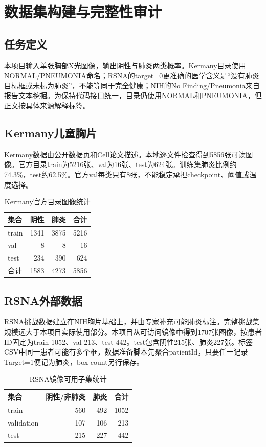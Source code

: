 \chapter{数据集构建与完整性审计}

\section{任务定义}

本项目输入单张胸部X光图像，输出阴性与肺炎两类概率。Kermany目录使用NORMAL/PNEUMONIA命名；RSNA的target=0更准确的医学含义是“没有肺炎目标框或未标为肺炎”，不能等同于完全健康；NIH的No Finding/Pneumonia来自报告文本挖掘。为保持代码接口统一，目录仍使用NORMAL和PNEUMONIA，但正文按具体来源解释标签。

\section{Kermany儿童胸片}

Kermany数据由公开数据页和Cell论文描述\cite{kermanydata2018,kermany2018}。本地逐文件检查得到5856张可读图像。官方目录train为5216张、val为16张、test为624张。训练集肺炎比例约74.3\%，test约62.5\%。官方val每类只有8张，不能稳定承担checkpoint、阈值或温度选择。

\begin{table}[H]
\centering
\caption{Kermany官方目录图像统计}
\begin{tabular}{lrrr}
\toprule 集合 & 阴性 & 肺炎 & 合计\\\midrule
train & 1341 & 3875 & 5216\\
val & 8 & 8 & 16\\
test & 234 & 390 & 624\\\midrule
合计 & 1583 & 4273 & 5856\\\bottomrule
\end{tabular}
\end{table}

\section{RSNA外部数据}

RSNA挑战数据建立在NIH胸片基础上，并由专家补充可能肺炎标注\cite{shih2019rsna}。完整挑战集规模远大于本项目实际使用部分。本项目从可访问镜像中得到1707张图像，按患者ID固定为train 1052、val 213、test 442。test包含阴性215张、肺炎227张。标签CSV中同一患者可能有多个框，数据准备脚本先聚合patientId，只要任一记录Target=1便记为肺炎，box count另行保存。

\begin{table}[H]
\centering
\caption{RSNA镜像可用子集统计}
\begin{tabular}{lrrr}
\toprule 集合 & 阴性/非肺炎 & 肺炎 & 合计\\\midrule
train & 560 & 492 & 1052\\
validation & 107 & 106 & 213\\
test & 215 & 227 & 442\\\bottomrule
\end{tabular}
\end{table}

